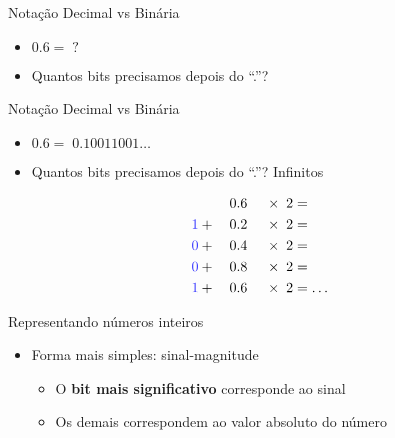 \documentclass[t, aspectratio=169]{beamer}
\begin{document}
\begin{frame}[label={sec:org304565f}]{Notação Decimal vs Binária}
\begin{itemize}
\item \(0.6 =\; ?\)
\item Quantos bits precisamos depois do ``.''?
\end{itemize}
\end{frame}

\begin{frame}[label={sec:orgb744fd1}]{Notação Decimal vs Binária}
\begin{itemize}
\item \(0.6 =\; 0.10011001\ldots\)
\item Quantos bits precisamos depois do ``.''? \alert{Infinitos}
\end{itemize}

\begin{alignat*}{2}
                             &\phantom{+ \quad}\;\, 0.6&& \; \times\; 2 = \\
    {\color{blue!80}1} &+ \quad 0.2&& \; \times\; 2 = \\
    {\color{blue!80}0} &+ \quad 0.4&& \; \times\; 2 = \\
    {\color{blue!80}0} &+ \quad 0.8&& \; \times\; 2 = \\
    {\color{blue!80}1} &+ \quad 0.6&& \; \times\; 2 = \ldots\\
\end{alignat*}
\end{frame}

\begin{frame}[label={sec:org9b7d48d}]{Representando números inteiros}
\begin{itemize}
\item Forma mais simples: \alert{sinal-magnitude}
\begin{itemize}
\item O {\bfseries\color{highlight}bit mais significativo} corresponde ao sinal
\item Os demais correspondem ao valor absoluto do número
\end{itemize}
\end{itemize}
\end{frame}
\end{document}
